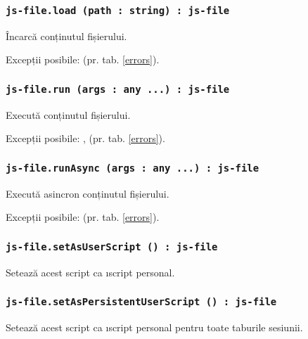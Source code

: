 \subsubsection{\texttt{js-file.load (path : string) : js-file}}

Încarcă conținutul fișierului.

Excepții posibile:  (pr. tab. \ref{errors}).

\subsubsection{\texttt{js-file.run (args : any ...) : js-file}}

Execută conținutul fișierului.

Excepții posibile: ,  (pr. tab. \ref{errors}).

\subsubsection{\texttt{js-file.runAsync (args : any ...) : js-file}}

Execută asincron conținutul fișierului.

Excepții posibile:  (pr. tab. \ref{errors}).

\subsubsection{\texttt{js-file.setAsUserScript () : js-file}}

Setează acest script ca \i{script personal}.

\subsubsection{\texttt{js-file.setAsPersistentUserScript () : js-file}}

Setează acest script ca \i{script personal} pentru toate taburile sesiunii.

